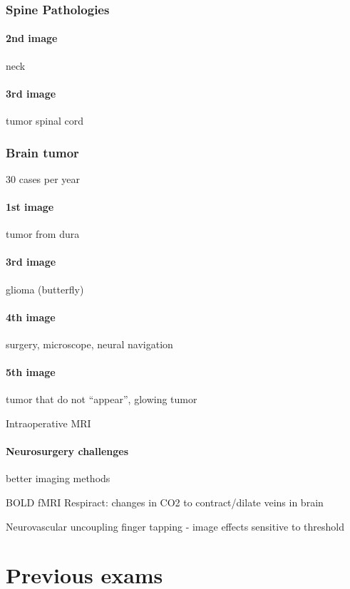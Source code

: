 \documentclass[12pt,article,oneside,a4paper]{memoir}
\begin{document}
\subsubsection{Spine Pathologies}
\paragraph{2nd image} neck
\paragraph{3rd image} tumor spinal cord

\subsubsection{Brain tumor} 30 cases per year
\paragraph{1st image} tumor from dura
\paragraph{3rd image} glioma (butterfly)
\paragraph{4th image} surgery, microscope, neural navigation
\paragraph{5th image} tumor that do not ``appear'', glowing tumor

Intraoperative MRI

\paragraph{Neurosurgery challenges} better imaging methods

BOLD fMRI
Respiract: changes in CO2 to contract/dilate veins in brain

Neurovascular uncoupling
finger tapping - image effects
sensitive to threshold


\newpage
\section{Previous exams}
\end{document}
